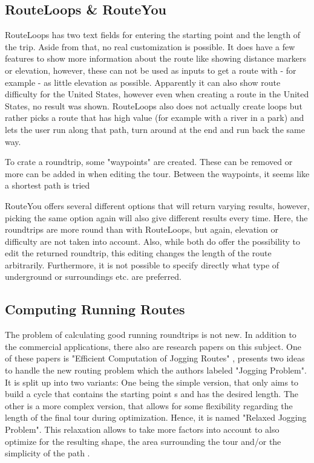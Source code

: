 \subsection{RouteLoops \& RouteYou}
\label{subsec:routeLoopsrouteYou}
RouteLoops has two text fields for entering the starting point and the length of the trip.
Aside from that, no real customization is possible.
It does have a few features to show more information about the route like showing distance markers or elevation, however, these can not be used as inputs to get a route with - for example - as little elevation as possible.
Apparently it can also show route difficulty for the United States, however even when creating a route in the United States, no result was shown. 
RouteLoops also does not actually create loops but rather picks a route that has high value (for example with a river in a park) and lets the user run along that path, turn around at the end and run back the same way.

To crate a roundtrip, some "waypoints" are created. 
These can be removed or more can be added in when editing the tour.
Between the waypoints, it seems like a shortest path is tried 

RouteYou offers several different options that will return varying results, however, picking the same option again will also give different results every time.   
Here, the roundtrips are more round than with RouteLoops, but again, elevation or difficulty are not taken into account. 
Also, while both do offer the possibility to edit the returned roundtrip, this editing changes the length of the route arbitrarily.
Furthermore, it is not possible to specify directly what type of underground or surroundings etc. are preferred. 

\subsection{Computing Running Routes}
\label{subsec:runningRoutes}

The problem of calculating good running roundtrips is not new.
In addition to the commercial applications, there also are research papers on this subject.
One of these papers is "Efficient Computation of Jogging Routes" \cite{gemsaEfficientComputationJogging2013}, presents two ideas to handle the new routing problem which the authors labeled "Jogging Problem".
It is split up into two variants: 
One being the simple version, that only aims to build a cycle that contains the starting point s and has the desired length.
The other is a more complex version, that allows for some flexibility regarding the length of the final tour during optimization. 
Hence, it is named "Relaxed Jogging Problem". 
This relaxation allows to take more factors into account to also optimize for the resulting shape, the area surrounding the tour and/or the simplicity of the path \cite{gemsaEfficientComputationJogging2013}. 

